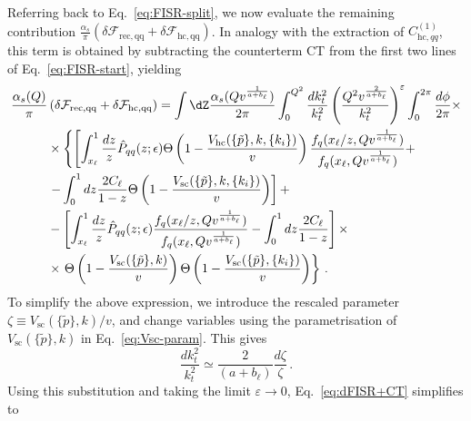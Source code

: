   Referring back to Eq.~\eqref{eq:FISR-split}, we now evaluate the remaining contribution 
$\frac{\alpha_s}{\pi}\left(\delta \mathcal{F}_{\mathrm{rec,qq}}+\delta \mathcal{F}_{\mathrm{hc,qq}}\right)$. 
In analogy with the extraction of $C^{(1)}_{\mathrm{hc},qq}$, this term is obtained by subtracting the counterterm $\mathrm{CT}$ from the first two lines of Eq.~\eqref{eq:FISR-start}, yielding
\begin{equation}
\label{eq:dFISR+CT}
\begin{aligned}
  \frac{\alpha_s(Q)}{\pi}&\left(\delta \mathcal{F}_{\mathrm{rec,qq}}+\delta \mathcal{F}_{\mathrm{hc,qq}}\right)=\int \dZ
  \frac{\alpha_s(Qv^{\frac{1}{a+b_\ell}})}{2\pi} \int_0^{Q^2}\frac{dk_t^2}{k_t^2}
\left(\frac{Q^2v^{\frac{2}{a+b_\ell}}}{k_t^2}\right)^{\varepsilon} \int_0^{2\pi}\frac{d\phi}{2\pi}
\times \\
&\times \left\{\left[\int_{x_\ell}^1 \frac{dz}{z}
\hat P_{qq}(z;\epsilon)
\Theta\left(1-\frac{V_{\mathrm{hc}}(\{\tilde{p}\},k,\{k_i\})}{v}\right)
\frac{f_q(x_\ell/z,Qv^{\frac{1}{a+b_\ell}})}{f_q(x_\ell,Qv^{\frac{1}{a+b_\ell}})}+\right.\right. \\
&\left.
  - \int_0^1 dz \frac{2C_\ell}{1-z}
\Theta\left(1-\frac{V_{\mathrm{sc}}(\{\tilde{p}\},k,\{k_i\})}{v}\right)\right] + \\
&-\left[\int_{x_\ell}^1\frac{dz}{z} \hat P_{qq}(z;\epsilon)
\frac{f_q(x_\ell/z,Qv^{\frac{1}{a+b_\ell}})}{f_q(x_\ell,Qv^{\frac{1}{a+b_\ell}})}
-\int_0^1dz\frac{2 C_\ell}{1-z}\right] \times\\
&\times \left.\Theta\left(1-\frac{V_{\mathrm{sc}}(\{\tilde{p}\},k)}{v}\right)
\Theta\left(1-\frac{V_{\mathrm{sc}}(\{\tilde{p}\},\{k_i\})}{v}\right)
\right\}\,.
\end{aligned}
\end{equation}
To simplify the above expression, we introduce the rescaled parameter $
\zeta \equiv V_{\mathrm{sc}}(\{\tilde{p}\},k)/v$, and change variables using the parametrisation of
$V_{\mathrm{sc}}(\{\tilde{p}\},k)$ in Eq.~\eqref{eq:Vsc-param}. This gives
\begin{equation}
	\frac{dk_t^2}{k_t^2}\simeq\frac{2}{\left(a+b_\ell\right)}\frac{d\zeta}{\zeta}\,.
\end{equation}
Using this substitution and taking the limit $\varepsilon \to 0$, Eq.~\eqref{eq:dFISR+CT} simplifies to

